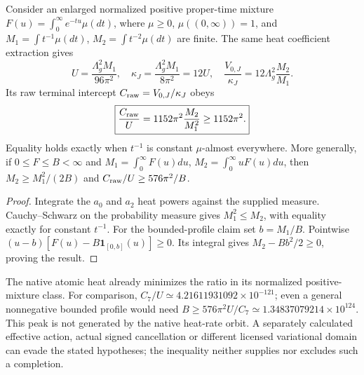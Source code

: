 \documentclass[11pt,a4paper]{article}
\begin{document}
\begin{theorem}
\label{p3f:thm:v2216-positive-profile-vacuum-bound}
Consider an enlarged normalized positive proper-time mixture
$F(u)=\int_0^\infty e^{-tu}\mu(dt)$, where
$\mu\ge0$, $\mu((0,\infty))=1$, and
$M_1=\int t^{-1}\mu(dt)$, $M_2=\int t^{-2}\mu(dt)$ are finite.
The same heat coefficient extraction gives
\[
 U=\frac{\Lambda_g^2M_1}{96\pi^2},\quad
 \kappa_J=\frac{\Lambda_g^2M_1}{8\pi^2}=12U,\quad
 \frac{V_{0,J}}{\kappa_J}=12\Lambda_g^2\frac{M_2}{M_1}.
\]
Its raw terminal intercept $C_{\rm raw}=V_{0,J}/\kappa_J$ obeys
\begin{equation}
 \boxed{\frac{C_{\rm raw}}U
 =1152\pi^2\frac{M_2}{M_1^2}\ge1152\pi^2.}
 \label{p3f:eq:v2216-positive-profile-vacuum-bound}
\end{equation}
Equality holds exactly when $t^{-1}$ is constant $\mu$-almost
everywhere.  More generally, if $0\le F\le B<\infty$ and
$M_1=\int_0^\infty F(u)du$, $M_2=\int_0^\infty uF(u)du$,
then $M_2\ge M_1^2/(2B)$ and
$C_{\rm raw}/U\ge576\pi^2/B$.
\end{theorem}
\begin{proof}
Integrate the $a_0$ and $a_2$ heat powers against the supplied measure.
Cauchy--Schwarz on the probability measure gives $M_1^2\le M_2$,
with equality exactly for constant $t^{-1}$.  For the bounded-profile
claim set $b=M_1/B$.  Pointwise
$(u-b)[F(u)-B\mathbf1_{[0,b]}(u)]\ge0$.
Its integral gives $M_2-Bb^2/2\ge0$, proving the result.
\end{proof}
The native atomic heat already minimizes the ratio in its normalized
positive-mixture class.  For comparison, $C_7/U\simeq
4.21611931092\times10^{-121}$; even a general nonnegative bounded
profile would need $B\ge576\pi^2U/C_7\simeq
1.34837079214\times10^{124}$.  This peak is not generated by the native
heat-rate orbit.  A separately calculated effective action, actual
signed cancellation or different licensed variational domain can evade
the stated hypotheses; the inequality neither supplies nor excludes
such a completion.
\end{document}
